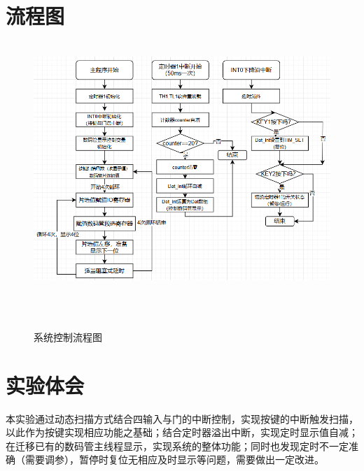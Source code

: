 \documentclass[12pt,hyperref,a4paper,UTF8]{ctexart}
\begin{document}
\section{流程图}


\begin{figure}[H] %
        \centering
        \includegraphics[width=1\textwidth]{figures/301.png} %
        \caption{系统控制流程图} %
        \label{fig:example} %
\end{figure}



\section{实验体会}


本实验通过动态扫描方式结合四输入与门的中断控制，实现按键的中断触发扫描，以此作为按键实现相应功能之基础；结合定时器溢出中断，实现定时显示值自减；
在迁移已有的数码管主线程显示，实现系统的整体功能；同时也发现定时不一定准确（需要调参），暂停时复位无相应及时显示等问题，需要做出一定改进。
\end{document}
